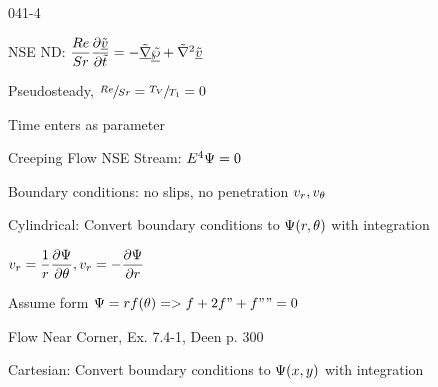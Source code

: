 \begin{mitframe}{041-4}

                
\begin{listone}
\item NSE ND: $\dfrac{\reynolds}{\strouhal}\dfrac{\partial\uline{\tilde{\vvel}}}{\partial\tilde{t}}=-\tilde{\gradop}\uline{\tilde{\dynpress}}+\tilde{\nabla}^2\uline{\tilde{\vvel}}$

				\begin{listtwo}
                \item Pseudosteady, $\sfrac{\reynolds}{\strouhal}=\sfrac{\Temp_{\vol}}{\Temp_1}=0$
                \item Time enters as parameter
                \end{listtwo}
                
\item Creeping Flow NSE Stream: $\energy^4\streamfunc=0$
\item Boundary conditions: no slips, no penetration $\vvel_{\pos}, \vvel_{\theta}$
\item Cylindrical: Convert boundary conditions to $\streamfunc(\pos,\theta)$ with integration

				\begin{listtwo}
                \item $\vvel_{\pos}=\dfrac{1}{\pos}\dfrac{\partial\streamfunc}{\partial\theta}, \vvel_{\pos}=-\dfrac{\partial\streamfunc}{\partial\pos}$
                
                			\begin{listthree}
                            \item Assume form  $\streamfunc=\pos\fug(\theta)=>\fug+2\fug"+\fug""=0$
                            \item Flow Near Corner, Ex. 7.4-1, Deen p. 300
                            
                            \end{listthree}
                \end{listtwo}
\item Cartesian: Convert boundary conditions to $\streamfunc(\disp, y)$ with integration


\end{listone}
\end{mitframe}
